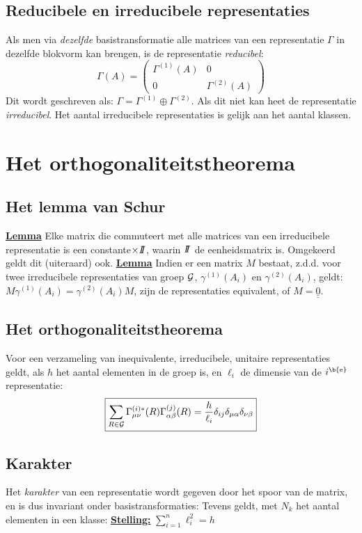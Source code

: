 \subsection{Reducibele en irreducibele representaties}
Als men via {\it dezelfde} basistransformatie alle matrices van een representatie
$\Gamma$ in dezelfde blokvorm kan brengen, is de representatie {\it reducibel}:
\[
\Gamma(A)=\left(\begin{array}{cc}
\Gamma^{(1)}(A)&0\\ 0&\Gamma^{(2)}(A)
\end{array}\right)
\]
Dit wordt geschreven als: $\Gamma=\Gamma^{(1)}\oplus\Gamma^{(2)}$.
Als dit niet kan heet de representatie {\it irreducibel}.
\npar
Het aantal irreducibele representaties is gelijk aan het aantal klassen.

\section{Het orthogonaliteitstheorema}
\subsection{Het lemma van Schur}
\underline{\bf Lemma} Elke matrix die commuteert met alle matrices van een
irreducibele representatie is een constante$\times I\hspace{-0.8ex}I$, waarin $I\hspace{-0.8ex}I$ de
eenheidsmatrix is. Omgekeerd geldt dit (uiteraard) ook.
\npar
\underline{\bf Lemma} Indien er een matrix $M$ bestaat, z.d.d. voor twee
irreducibele representaties van groep ${\cal{G}}$, $\gamma^{(1)}(A_i)$ en $\gamma^{(2)}(A_i)$,
geldt: $M\gamma^{(1)}(A_i)=\gamma^{(2)}(A_i)M$, zijn de representaties
equivalent, of $M=\underline{\underline{0}}$.

\subsection{Het orthogonaliteitstheorema}
Voor een verzameling van inequivalente, irreducibele, unitaire representaties
geldt, als $h$ het aantal elementen in de groep is, en $\ell_i$ de dimensie
van de $i^{\b{\rm e}}$ representatie:
\[
\mbox{\fbox{$\displaystyle
\sum_{R\in{\cal{G}}}\Gamma^{(i)*}_{\mu\nu}(R)\Gamma^{(j)}_{\alpha\beta}(R)=
\frac{h}{\ell_i}\delta_{ij}\delta_{\mu\alpha}\delta_{\nu\beta}
$}}
\]

\subsection{Karakter}
Het {\it karakter} van een representatie wordt gegeven door het spoor van de
matrix, en is dus invariant onder basistransformaties:
\npar
Tevens geldt, met $N_k$ het aantal elementen in een klasse:
\npar
\underline{\bf Stelling:} $\displaystyle\sum_{i=1}^{n}\ell_{i}^{2}=h$

